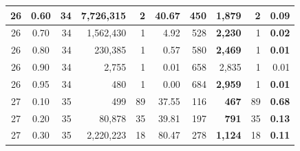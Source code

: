\begin{table}[H]
\begin{tabular}{|c|c|r|r|r|r|r|r|r|r|}
        26                              & 0.60                               & 34                                              & 7,726,315                                          & 2             & 40.67         & 450           & \textbf{1,879}   & 2             & \textbf{0.09} \\ \hline
        26                              & 0.70                               & 34                                              & 1,562,430                                          & 1             & 4.92          & 528           & \textbf{2,230}   & 1             & \textbf{0.02} \\ \hline
        26                              & 0.80                               & 34                                              & 230,385                                            & 1             & 0.57          & 580           & \textbf{2,469}   & 1             & \textbf{0.01} \\ \hline
        26                              & 0.90                               & 34                                              & 2,755                                              & 1             & 0.01          & 658           & 2,835            & 1             & 0.01          \\ \hline
        26                              & 0.95                               & 34                                              & 480                                                & 1             & 0.00          & 684           & \textbf{2,959}   & 1             & \textbf{0.01} \\ \hline
        27                              & 0.10                               & 35                                              & 499                                                & 89            & 37.55         & 116           & \textbf{ 467}    & 89            & \textbf{0.68} \\ \hline
        27                              & 0.20                               & 35                                              & 80,878                                             & 35            & 39.81         & 197           & \textbf{ 791}    & 35            & \textbf{0.13} \\ \hline
        27                              & 0.30                               & 35                                              & 2,220,223                                          & 18            & 80.47         & 278           & \textbf{1,124}   & 18            & \textbf{0.11} \\ \hline

\end{tabular}
\end{table}
